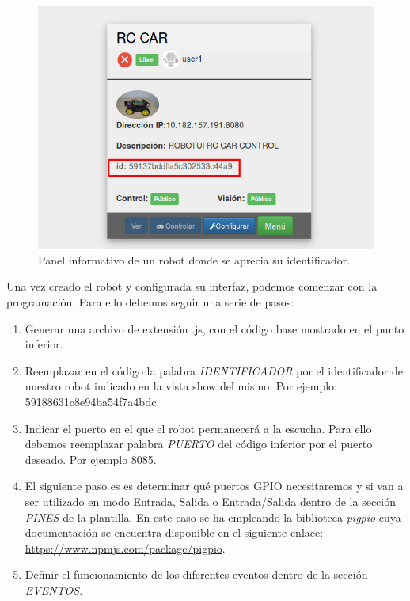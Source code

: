 \begin{figure}[H]
  \begin{center}
    \includegraphics[scale=.6]{imagenes/manual-usuario/identificador.png}
  \end{center}
  \caption{Panel informativo de un robot donde se aprecia su identificador.}
  \label{website:pagina-principal}
\end{figure}


Una vez creado el robot y configurada su interfaz, podemos comenzar con la programación. Para ello debemos seguir una serie de pasos:\\

\begin{enumerate}
  \item Generar una archivo de extensión .js, con el código base mostrado en el punto inferior.
  \item Reemplazar en el código la palabra \emph{IDENTIFICADOR} por el identificador de nuestro robot indicado en la vista show del mismo. Por ejemplo: 59188631c8e94ba54f7a4bdc
  \item Indicar el puerto en el que el robot permanecerá a la escucha. Para ello debemos reemplazar palabra \emph{PUERTO} del código inferior por el puerto deseado. Por ejemplo 8085. 
  \item El siguiente paso es es determinar qué puertos GPIO necesitaremos y si van a ser utilizado en modo Entrada, Salida o Entrada/Salida dentro de la sección \emph{PINES} de la plantilla. En este caso 
  se ha empleando la biblioteca \emph{pigpio} cuya documentación se encuentra disponible en el siguiente enlace: \url{https://www.npmjs.com/package/pigpio}.
  \item Definir el funcionamiento de los diferentes eventos dentro de la sección \emph{EVENTOS}. 
\end{enumerate}


